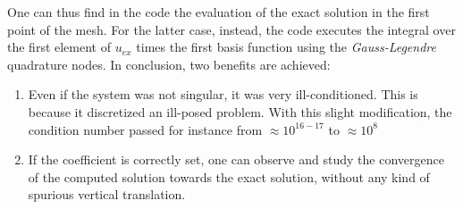\documentclass[a4paper]{article}
\begin{document}
\vspace{5mm}
\noindent One can thus find in the code the evaluation of the exact solution in the first point of the mesh. For the latter case, instead, the code executes the integral over the first element of $u_{ex}$ times the first basis function using the \emph{Gauss-Legendre} quadrature nodes.
\vspace{3mm}
\newline In conclusion, two benefits are achieved:
\begin{enumerate}
	\item Even if the system was not singular, it was very ill-conditioned. This is because it discretized an ill-posed problem. With this slight modification, the condition number passed for instance from $\approx 10^{16-17}$ to $ \approx10^8$  
	\item If the coefficient is correctly set, one can observe and study the convergence of the computed solution towards the exact solution, without any kind of spurious vertical translation.
\end{enumerate}
\end{document}

